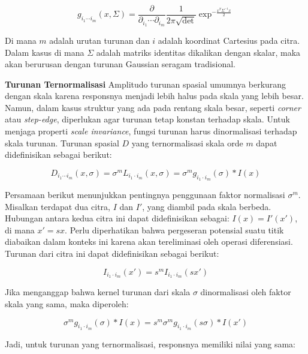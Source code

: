 \begin{equation*}
  g_{i_{1}\cdots i_{m}}(x,\Sigma) =\frac{\partial}{\partial_{i_{1}}\cdots \partial_{i_{m}}}\frac{1}{2\pi\sqrt{\det}}\exp^{-\frac{x^{T}\Sigma^{-1}x}{2}}
\end{equation*}

Di mana \(m\) adalah urutan turunan dan \(i\) adalah koordinat Cartesius pada citra. Dalam kasus di mana \(\Sigma\) adalah matriks identitas dikalikan dengan skalar, maka akan berurusan dengan turunan Gaussian seragam tradisional.

\textbf{Turunan Ternormalisasi} Amplitudo turunan spasial umumnya berkurang dengan skala karena responsnya menjadi lebih halus pada skala yang lebih besar. Namun, dalam kasus struktur yang ada pada rentang skala besar, seperti \emph{corner} atau \emph{step-edge}, diperlukan agar turunan tetap konstan terhadap skala. Untuk menjaga properti \emph{scale invariance}, fungsi turunan harus dinormalisasi terhadap skala turunan. Turunan spasial \(D\) yang ternormalisasi skala orde \(m\) dapat didefinisikan sebagai berikut:

\begin{equation*}
  D_{i_{1}\cdots i_{m}}(x,\sigma) = \sigma^{m}L_{i_{1} \cdot i_{m}}(x,\sigma) = \sigma^{m}g_{i_{1}\cdot i_{m}}(\sigma)*I(x)
\end{equation*}

Persamaan berikut menunjukkan pentingnya penggunaan faktor normalisasi \(\sigma^{m}\). Misalkan terdapat dua citra, \(I\) dan \(I'\), yang diambil pada skala berbeda. Hubungan antara kedua citra ini dapat didefinisikan sebagai: \(I(x) = I'(x')\), di mana \(x' = sx\). Perlu diperhatikan bahwa pergeseran potensial suatu titik diabaikan dalam konteks ini karena akan tereliminasi oleh operasi diferensiasi. Turunan dari citra ini dapat didefinisikan sebagai berikut:

\begin{equation*}
  I_{i_{1}\cdot i_{m}}(x') = s^{m}I_{i_{1}\cdot i_{m}}(sx')
\end{equation*}

Jika menganggap bahwa kernel turunan dari skala \(\sigma\) dinormalisasi oleh faktor skala yang sama, maka diperoleh:

\begin{equation*}
  \sigma^{m}g_{i_{1}\cdot i_{m}}(\sigma) * I(x)= s^{m}\sigma^{m}g_{i_{1}\cdot i_{m}}(s\sigma)*I(x')
\end{equation*}

Jadi, untuk turunan yang ternormalisasi, responsnya memiliki nilai yang sama:

